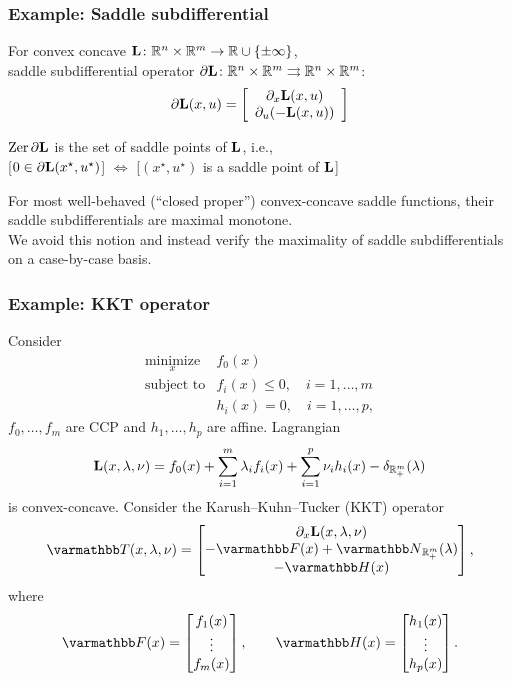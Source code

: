 \documentclass[10pt,mathserif]{beamer}
\begin{document}
\begin{frame}
\frametitle{Example: Saddle subdifferential}
For convex concave $\mathbf{L}\colon\mathbb{R}^n \times \mathbb{R}^m \to \mathbb{R}\cup\{\pm \infty\}$,\\
saddle subdifferential operator
$\partial \mathbf{L}\colon\mathbb{R}^n \times \mathbb{R}^m\rightrightarrows\mathbb{R}^n \times \mathbb{R}^m$:
\[\partial \mathbf{L}(x,u) =
\left[ \begin{array}{c}  \partial_x \mathbf{L}(x,u) \\ \partial_u (-\mathbf{L}(x,u))
\end{array}\right]
\]
\vspace{0.2in}

$\mathrm{Zer}\,\partial \mathbf{L}$ is the set of saddle points of $\mathbf{L}$, i.e.,\\

[$0\in \partial \mathbf{L}(x^\star,u^\star)$] $\Leftrightarrow$ [$(x^\star,u^\star)$ is a saddle point of $\mathbf{L}$]

\vspace{0.2in}

For most well-behaved (``closed proper'') convex-concave saddle functions, their saddle subdifferentials are maximal monotone.\\
We avoid this notion and instead verify the maximality of saddle subdifferentials on a case-by-case basis.

\end{frame}


\begin{frame}
\frametitle{Example: KKT operator}
Consider
\[
\begin{array}{ll}
\underset{x}{\mbox{minimize}}&f_0(x)\\
\mbox{subject to}&f_i(x)\le 0,\quad i=1,\ldots,m\\
&h_i(x)=0,\quad i=1,\ldots,p,
\end{array}
\]
$f_0,\dots,f_m$ are CCP and $h_1,\dots,h_p$ are affine.
Lagrangian
\[
\mathbf{L}(x, \lambda,\nu) =f_0(x) + \sum_{i=1}^m \lambda_i f_i(x)+\sum^p_{i=1}\nu_ih_i(x)-\delta_{\mathbb{R}_+^m}(\lambda)
\]
is convex-concave. Consider the Karush--Kuhn--Tucker (KKT) operator
\[
\opT (x, \lambda,\nu) = \begin{bmatrix} \partial_x \lagrange(x, \lambda,\nu) \\ -\opF(x)+\opN_{{\reals_+^m}}(\lambda)\\-\opH(x) \end{bmatrix},
\]
where
\[
\opF(x) =  \begin{bmatrix}f_1(x) \\ \vdots \\ f_m(x)\end{bmatrix},
\qquad
\opH(x) =  \begin{bmatrix} h_1(x) \\ \vdots \\ h_p(x) \end{bmatrix}.
\]
\end{frame}
\end{document}
